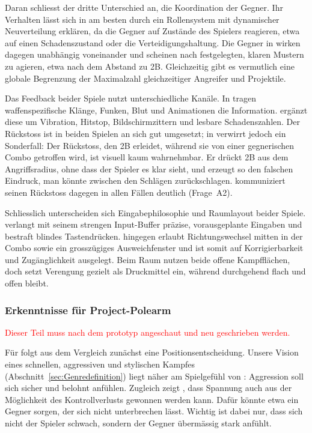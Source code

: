 \documentclass[../Main.tex]{subfiles}
\begin{document}
Daran schliesst der dritte Unterschied an, die Koordination der Gegner. Ihr Verhalten lässt sich in  am besten durch ein Rollensystem mit dynamischer Neuverteilung erklären, da die Gegner auf Zustände des Spielers reagieren, etwa auf einen Schadenszustand oder die Verteidigungshaltung. Die Gegner in  wirken dagegen unabhängig voneinander und scheinen nach festgelegten, klaren Mustern zu agieren, etwa nach dem Abstand zu 2B. Gleichzeitig gibt es vermutlich eine globale Begrenzung der Maximalzahl gleichzeitiger Angreifer und Projektile.

Das Feedback beider Spiele nutzt unterschiedliche Kanäle. In  tragen waffenspezifische Klänge, Funken, Blut und Animationen die Information.  ergänzt diese um Vibration, Hitstop, Bildschirmzittern und lesbare Schadenszahlen. Der Rückstoss ist in beiden Spielen an sich gut umgesetzt; in  verwirrt jedoch ein Sonderfall: Der Rückstoss, den 2B erleidet, während sie von einer gegnerischen Combo getroffen wird, ist visuell kaum wahrnehmbar. Er drückt 2B aus dem Angriffsradius, ohne dass der Spieler es klar sieht, und erzeugt so den falschen Eindruck, man könnte zwischen den Schlägen zurückschlagen.  kommuniziert seinen Rückstoss dagegen in allen Fällen deutlich (Frage~A2).

Schliesslich unterscheiden sich Eingabephilosophie und Raumlayout beider Spiele.  verlangt mit seinem strengen Input-Buffer präzise, vorausgeplante Eingaben und bestraft blindes Tastendrücken.  hingegen erlaubt Richtungswechsel mitten in der Combo sowie ein grosszügiges Ausweichfenster und ist somit auf Korrigierbarkeit und Zugänglichkeit ausgelegt. Beim Raum nutzen beide offene Kampfflächen, doch  setzt Verengung gezielt als Druckmittel ein, während  durchgehend flach und offen bleibt.

\subsubsection{Erkenntnisse für Project-Polearm}

\textcolor{red}{Dieser Teil muss nach dem prototyp angeschaut und neu geschrieben werden.}

Für  folgt aus dem Vergleich zunächst eine Positionsentscheidung. Unsere Vision eines schnellen, aggressiven und stylischen Kampfes (Abschnitt~\ref{sec:Genredefinition}) liegt näher am Spielgefühl von : Aggression soll sich sicher und belohnt anfühlen. Zugleich zeigt , dass Spannung auch aus der Möglichkeit des Kontrollverlusts gewonnen werden kann. Dafür könnte etwa ein Gegner sorgen, der sich nicht unterbrechen lässt. Wichtig ist dabei nur, dass sich nicht der Spieler schwach, sondern der Gegner übermässig stark anfühlt.
\end{document}

